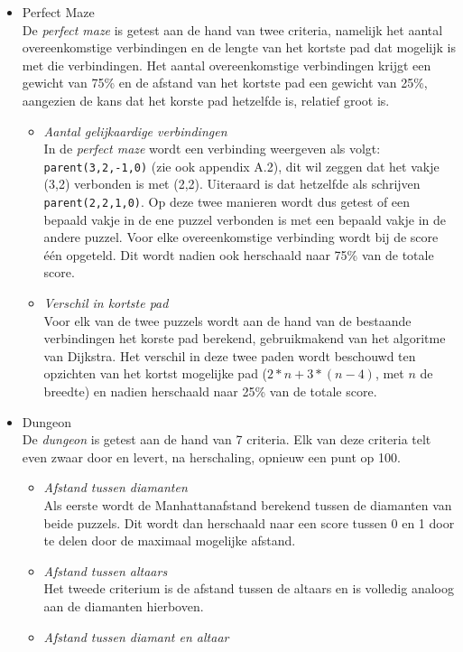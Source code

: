 \documentclass{article}
\begin{document}
\begin{itemize}
\begin{itemize}
\end{itemize}
\item Perfect Maze\\
De \textit{perfect maze} is getest aan de hand van twee criteria, namelijk het aantal overeenkomstige verbindingen en de lengte van het kortste pad dat mogelijk is met die verbindingen. Het aantal overeenkomstige verbindingen krijgt een gewicht van 75\% en de afstand van het kortste pad een gewicht van 25\%, aangezien de kans dat het korste pad hetzelfde is, relatief groot is.
\begin{itemize}
\item \textit{Aantal gelijkaardige verbindingen}\\
In de \textit{perfect maze} wordt een verbinding weergeven als volgt: \texttt{parent(3,2,-1,0)} (zie ook appendix A.2), dit wil zeggen dat het vakje (3,2) verbonden is met (2,2). Uiteraard is dat hetzelfde als schrijven \texttt{parent(2,2,1,0)}. Op deze twee manieren wordt dus getest of een bepaald vakje in de ene puzzel verbonden is met een bepaald vakje in de andere puzzel. Voor elke overeenkomstige verbinding wordt bij de score \'e\'en opgeteld. Dit wordt nadien ook herschaald naar 75\% van de totale score.
\item \textit{Verschil in kortste pad}\\
Voor elk van de twee puzzels wordt aan de hand van de bestaande verbindingen het korste pad berekend, gebruikmakend van het algoritme van Dijkstra. Het verschil in deze twee paden wordt beschouwd ten opzichten van het kortst mogelijke pad ($2*n + 3*(n-4)$, met $n$ de breedte) en nadien herschaald naar 25\% van de totale score.
\end{itemize}
\item Dungeon\\
De \textit{dungeon} is getest aan de hand van 7 criteria. Elk van deze criteria telt even zwaar door en levert, na herschaling, opnieuw een punt op 100.
\begin{itemize}
\item \textit{Afstand tussen diamanten}\\
Als eerste wordt de Manhattanafstand berekend tussen de diamanten van beide puzzels. Dit wordt dan herschaald naar een score tussen 0 en 1 door te delen door de maximaal mogelijke afstand.
\item \textit{Afstand tussen altaars}\\
Het tweede criterium is de afstand tussen de altaars en is volledig analoog aan de diamanten hierboven.
\item \textit{Afstand tussen diamant en altaar}\\

\end{itemize}
\end{itemize}
\end{document}
